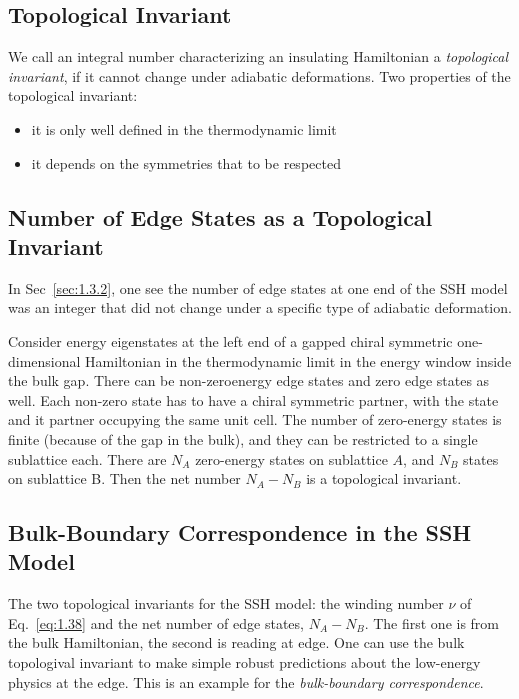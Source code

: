 \subsection{Topological Invariant}\label{sec:1.5.2}
We call an integral number characterizing an insulating Hamiltonian a \textit{topological invariant}, if it cannot change under adiabatic deformations.
Two properties of the topological invariant:
\begin{itemize}
    \item it is only well defined in the thermodynamic limit
    \item it depends on the symmetries that to be respected
\end{itemize}

\subsection{Number of Edge States as a Topological Invariant}\label{sec:1.5.3}
In Sec~\ref{sec:1.3.2}, one see the number of edge states at one end of the SSH model was an integer that did not change under a specific type of adiabatic deformation.

Consider energy eigenstates at the left end of a gapped chiral symmetric one-dimensional Hamiltonian in the thermodynamic limit in the energy window inside the bulk gap.
There can be non-zeroenergy edge states and zero edge states as well.
Each non-zero state has to have a chiral symmetric partner, with the state and it partner occupying the same unit cell.
The number of zero-energy states is finite (because of the gap in the bulk), and they can be restricted to a single sublattice each.
There are $N_A$ zero-energy states on sublattice $A$, and $N_B$ states on sublattice B.
Then the net number $N_A-N_B$ is a topological invariant.

\subsection{Bulk-Boundary Correspondence in the SSH Model}\label{sec:1.5.4}
The two topological invariants for the SSH model: the winding number $\nu$ of Eq.~\ref{eq:1.38} and the net number of edge states, $N_A - N_B$.
The first one is from the bulk Hamiltonian, the second is reading at edge.
One can use the bulk topologival invariant to make simple robust predictions about the low-energy physics at the edge.
This is an example for the \textit{bulk-boundary correspondence}.


